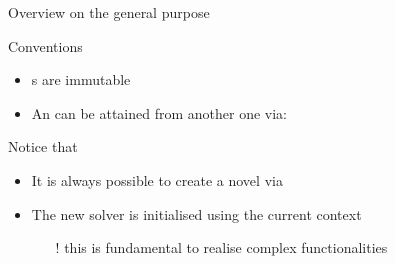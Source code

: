 \documentclass[handout]{beamer}
\begin{document}
\begin{frame}[allowframebreaks]{Overview on the general purpose }
    \begin{alertblock}{Conventions}
        \begin{itemize}
            \item {}s are \alert{immutable}

            \item An  can be attained from another one via:
        \end{itemize}
    \end{alertblock}

    \framebreak

    \begin{exampleblock}{Notice that}
        \begin{itemize}
            \item It is always possible to create a novel  via

            \item The new solver is initialised using the current context
            \begin{itemize}
                \item[!] this is fundamental to realise complex functionalities
            \end{itemize}
        \end{itemize}
    \end{exampleblock}
\end{frame}
\end{document}

